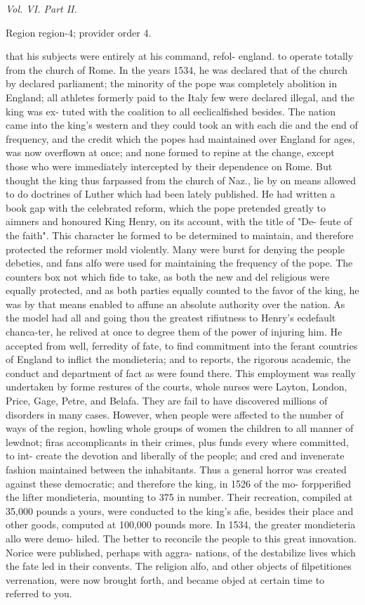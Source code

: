 \documentclass[11pt]{article}
\begin{document}
{\small\itshape Vol. VI. Part II.\par}

{\scriptsize\color{gray} Region region-4; provider order 4.\par}
\medskip

that his subjects were entirely at his command, refol- england.
to operate totally from the church of Rome. In the years 1534, he was declared that of the church by declared parliament; the minority of the pope was completely abolition in England; all athletes formerly paid to the Italy few were declared illegal, and the king was ex- tuted with the coalition to all eeclicalfished besides. The nation came into the king’s western and they could took an with each die and the end of frequency, and the credit which the popes had maintained over England for ages, was now overflown at once; and none formed to repine at the change, except those who were immediately intercepted by their dependence on Rome. But thought the king thus farpassed from the church of Naz., lie by on means allowed to do doctrines of Luther which had been lately published. He had written a book gap with the celebrated reform, which the pope pretended greatly to aimners and honoured King Henry, on its account, with the title of "De- feute of the faith". This character he formed to be determined to maintain, and therefore protected the reformer mold violently. Many were burst for denying the people debeties, and fans alfo were used for maintaining the frequency of the pope. The counters box not which fide to take, as both the new and del religious were equally protected, and as both parties equally counted to the favor of the king, he was by that means enabled to affune an absolute authority over the nation. As the model had all and going thou the greatest rifiutness to Henry’s ecdefault chanca-ter, he relived at once to degree them of the power of injuring him. He accepted from well, ferredity of fate, to find commitment into the ferant countries of England to inflict the mondieteria; and to reports, the rigorous academic, the conduct and department of fact as were found there. This employment was really undertaken by forme restures of the courts, whole nurses were Layton, London, Price, Gage, Petre, and Belafa. They are fail to have discovered millions of disorders in many cases. However, when people were affected to the number of ways of the region, howling whole groups of women the children to all manner of lewdnot; firas accomplicants in their crimes, plus funds every where committed, to int- create the devotion and liberally of the people; and cred and invenerate fashion maintained between the inhabitants. Thus a general horror was created against these democratic; and therefore the king, in 1526 of the mo- forpperified the lifter mondieteria, mounting to 375 in number. Their recreation, compiled at 35,000 pounds a yours, were conducted to the king’s afie, besides their place and other goods, computed at 100,000 pounds more. In 1534, the greater mondieteria allo were demo- hiled. The better to reconcile the people to this great innovation. Norice were published, perhaps with aggra- nations, of the destabilize lives which the fate led in their convents. The religion alfo, and other objects of filpetitiones verrenation, were now brought forth, and became objed at certain time to referred to you.
\end{document}
